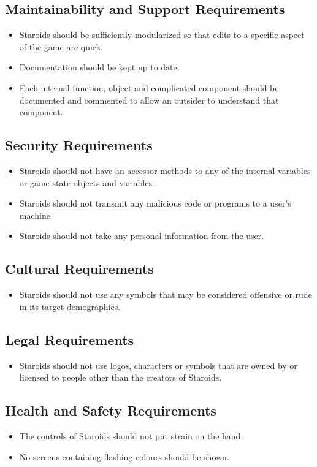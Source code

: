 \documentclass[12pt, titlepage]{article}
\begin{document}
\subsection{Maintainability and Support Requirements}
  \begin{itemize}
    \item Staroids should be sufficiently modularized so that edits to a specific aspect of the game are quick.
    \item Documentation should be kept up to date.
    \item Each internal function, object and complicated component should be documented and commented to allow an outsider to understand that component.
  \end{itemize}

\subsection{Security Requirements}
  \begin{itemize}
    \item Staroids should not have an accessor methods to any of the internal variables or game state objects and variables.
    \item Staroids should not transmit any malicious code or programs to a user's machine
    \item Staroids should not take any personal information from the user.
  \end{itemize}

\subsection{Cultural Requirements}
  \begin{itemize}
    \item Staroids should not use any symbols that may be considered offensive or rude in its target demographics.
  \end{itemize}

\subsection{Legal Requirements}
  \begin{itemize}
    \item Staroids should not use logos, characters or symbols that are owned by or licensed to people other than the creators of Staroids.
  \end{itemize}

\subsection{Health and Safety Requirements}
  \begin{itemize}
    \item The controls of Staroids should not put strain on the hand.
    \item No screens containing flashing colours should be shown.
  \end{itemize}
\end{document}
